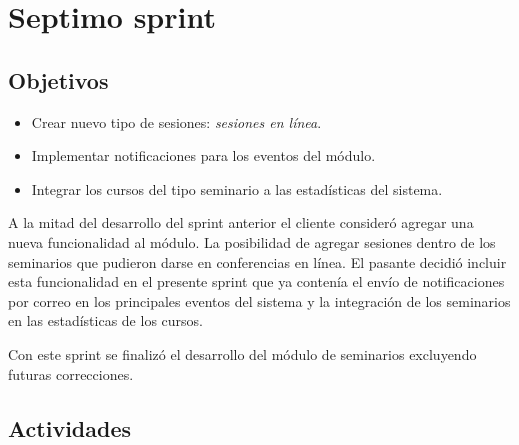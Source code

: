 \section{Septimo sprint} %
\label{sec:septimo_sprint}

\subsection{Objetivos}

\begin{itemize}
	\item Crear nuevo tipo de sesiones: \emph{sesiones en línea}.
	\item Implementar notificaciones para los eventos del módulo.
	\item Integrar los cursos del tipo seminario a las estadísticas del sistema.
\end{itemize}

A la mitad del desarrollo del sprint anterior el cliente consideró agregar una nueva funcionalidad al módulo. La posibilidad de agregar sesiones dentro de los seminarios que pudieron darse en conferencias en línea. El pasante decidió incluir esta funcionalidad en el presente sprint que ya contenía el envío de notificaciones por correo en los principales eventos del sistema y la integración de los seminarios en las estadísticas de los cursos.

Con este sprint se finalizó el desarrollo del módulo de seminarios excluyendo futuras correcciones.

\subsection{Actividades} %
\label{sub:actividades7}

